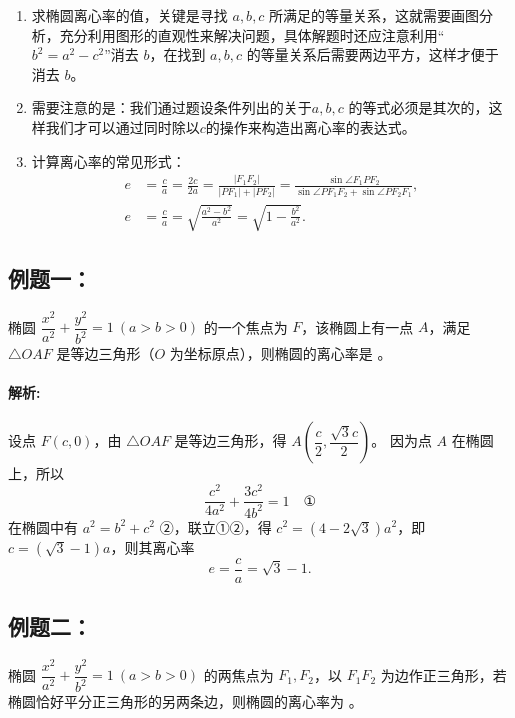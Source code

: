 \documentclass{article}
\begin{document}
\begin{tcolorbox}[colback=blue!10,colframe=blue!70!black,title=求椭圆离心率的基本思路]
\begin{enumerate}
    \item 求椭圆离心率的值，关键是寻找 \(a,b,c\) 所满足的等量关系，这就需要画图分析，充分利用图形的直观性来解决问题，具体解题时还应注意利用“\(b^2 = a^2 - c^2\)”消去 \(b\)，在找到 \(a,b,c\) 的等量关系后需要两边平方，这样才便于消去 \(b\)。
    \item 需要注意的是：我们通过题设条件列出的关于\(a,b,c\) 的等式必须是其次的，这样我们才可以通过同时除以\(c\)的操作来构造出离心率的表达式。
    \item 计算离心率的常见形式：
    \[
    \begin{aligned}
    e &= \frac{c}{a} = \frac{2c}{2a} = \frac{|F_1F_2|}{|PF_1| + |PF_2|} = \frac{\sin \angle F_1PF_2}{\sin \angle PF_1F_2 + \sin \angle PF_2F_1}, \\
    e &= \frac{c}{a} = \sqrt{\frac{a^2 - b^2}{a^2}} = \sqrt{1 - \frac{b^2}{a^2}}.
    \end{aligned}
    \]
\end{enumerate}
\end{tcolorbox}
\vspace{1\baselineskip}

\noindent\subsection*{例题一： }
椭圆 \(\dfrac{x^2}{a^2} + \dfrac{y^2}{b^2} = 1\ (a > b > 0)\) 的一个焦点为 \(F\)，该椭圆上有一点 \(A\)，满足 \(\triangle OAF\) 是等边三角形（\(O\) 为坐标原点），则椭圆的离心率是 \underline{\quad\quad\quad}。

\paragraph{解析:}
设点 \(F(c,0)\)，由 \(\triangle OAF\) 是等边三角形，得 \(A\left(\dfrac{c}{2},\dfrac{\sqrt{3}c}{2}\right)\)。
因为点 \(A\) 在椭圆上，所以
\[
\frac{c^2}{4a^2} + \frac{3c^2}{4b^2} = 1 \quad \text{①}
\]
在椭圆中有 \(a^2 = b^2 + c^2\) ②，联立①②，得 \(c^2 = (4 - 2\sqrt{3})a^2\)，即 \(c = (\sqrt{3} - 1)a\)，则其离心率
\[
e = \frac{c}{a} = \sqrt{3} - 1.
\]

\vspace{1em}

\subsection*{例题二： }
椭圆 \(\dfrac{x^2}{a^2} + \dfrac{y^2}{b^2} = 1\ (a > b > 0)\) 的两焦点为 \(F_1,F_2\)，以 \(F_1F_2\) 为边作正三角形，若椭圆恰好平分正三角形的另两条边，则椭圆的离心率为 \underline{\quad\quad\quad}。
\end{document}
